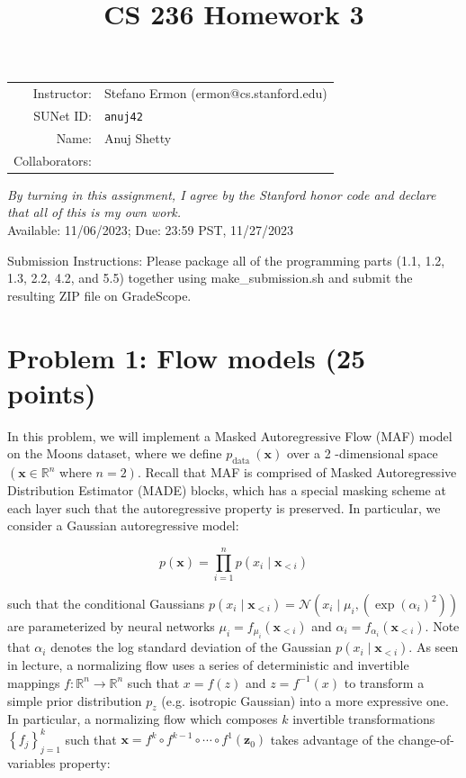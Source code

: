 \documentclass{article}
\title{CS 236 Homework 3 }
\theoremstyle{case}
\theoremstyle{definition}
\begin{document}
\maketitle

\begin{center}
\begin{tabular}{rl}
Instructor: & Stefano Ermon (ermon@cs.stanford.edu)\\
SUNet ID: & \texttt{anuj42} \\
Name: & Anuj Shetty\\
Collaborators: & 
\end{tabular}
\end{center}

\textit{By turning in this assignment, I agree by the Stanford honor code and declare
that all of this is my own work.} \\

Available: 11/06/2023; Due: 23:59 PST, 11/27/2023

Submission Instructions: Please package all of the programming parts (1.1, 1.2, 1.3, 2.2, 4.2, and 5.5) together using make\_submission.sh and submit the resulting ZIP file on GradeScope.

\section*{Problem 1: Flow models (25 points)}
In this problem, we will implement a Masked Autoregressive Flow (MAF) model on the Moons dataset, where we define $p_{\text {data }}(\boldsymbol{x})$ over a 2 -dimensional space $\left(\boldsymbol{x} \in \mathbb{R}^{n}\right.$ where $\left.n=2\right)$. Recall that MAF is comprised of Masked Autoregressive Distribution Estimator (MADE) blocks, which has a special masking scheme at each layer such that the autoregressive property is preserved. In particular, we consider a Gaussian autoregressive model:

$$
p(\boldsymbol{x})=\prod_{i=1}^{n} p\left(x_{i} \mid \boldsymbol{x}_{<i}\right)
$$

such that the conditional Gaussians $p\left(x_{i} \mid \boldsymbol{x}_{<i}\right)=\mathcal{N}\left(x_{i} \mid \mu_{i},\left(\exp \left(\alpha_{i}\right)^{2}\right)\right)$ are parameterized by neural networks $\mu_{i}=f_{\mu_{i}}\left(\boldsymbol{x}_{<i}\right)$ and $\alpha_{i}=f_{\alpha_{i}}\left(\boldsymbol{x}_{<i}\right)$. Note that $\alpha_{i}$ denotes the log standard deviation of the Gaussian $p\left(x_{i} \mid \boldsymbol{x}_{<i}\right)$. As seen in lecture, a normalizing flow uses a series of deterministic and invertible mappings $f: \mathbb{R}^{n} \rightarrow \mathbb{R}^{n}$ such that $x=f(z)$ and $z=f^{-1}(x)$ to transform a simple prior distribution $p_{z}$ (e.g. isotropic Gaussian) into a more expressive one. In particular, a normalizing flow which composes $k$ invertible transformations $\left\{f_{j}\right\}_{j=1}^{k}$ such that $\boldsymbol{x}=f^{k} \circ f^{k-1} \circ \cdots \circ f^{1}\left(\boldsymbol{z}_{0}\right)$ takes advantage of the change-of-variables property:
\end{document}
